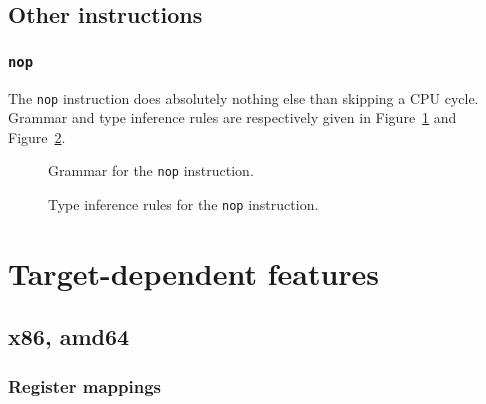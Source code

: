 \section{Other instructions}\label{sec:nstar-instructionset-other}

\subsection{\texttt{nop}}\label{subsec:nstar-instructionset-other-nop}

The \texttt{nop} instruction does absolutely nothing else than skipping a CPU cycle.
Grammar and type inference rules are respectively given in Figure~\ref{fig:nstar-instructionset-other-nop-grammar} and Figure~\ref{fig:nstar-instructionset-other-nop-typerules}.

\begin{figure}[H]
  \centering


  \caption{Grammar for the \texttt{nop} instruction.}
  \label{fig:nstar-instructionset-other-nop-grammar}
\end{figure}

\begin{figure}[H]
  \centering


  \caption{Type inference rules for the \texttt{nop} instruction.}
  \label{fig:nstar-instructionset-other-nop-typerules}
\end{figure}

\chapter{Target-dependent features}\label{chap:nstar-specific}

\section{x86, amd64}\label{sec:nstar-specific-x86amd64}

\subsection{Register mappings}\label{subsec:nstar-specific-x86amd64-registers}

